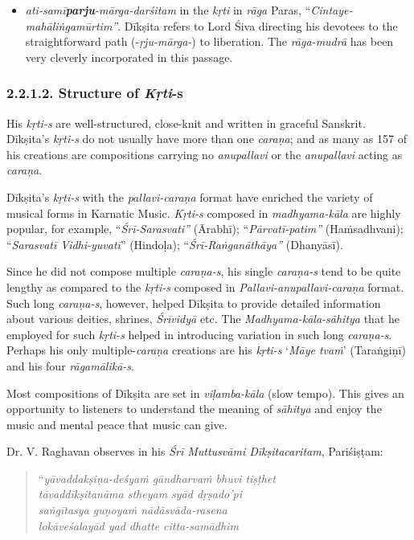 \begin{itemize}
 \item \textit{ati-samī\textbf{parju}-mārga-darśitam} in the \textit{kṛti} in \textit{rāga} Paras, “\textit{Cintaye-mahāliṅgamūrtim”}. Dīkṣita refers to Lord Śiva directing his devotees to the straightforward path (-\textit{ṛju-mārga-}) to liberation. The \textit{rāga-mudrā} has been very cleverly incorporated in this passage.

\end{itemize}


\subsubsection*{2.2.1.2. Structure of \textit{Kṛti}-s}

His \textit{kṛti-s} are well-structured, close-knit and written in graceful Sanskrit. Dīkṣita’s \textit{kṛti-s} do not usually have more than one \textit{caraṇa}; and as many as 157 of his creations are compositions carrying no \textit{anupallavi} or the \textit{anupallavi} acting as \textit{caraṇa}.

Dīkṣita’s \textit{kṛti-s} with the \textit{pallavi-caraṇa} format have enriched the variety of musical forms in Karnatic Music. \textit{Kṛti-s} composed in \textit{madhyama-kāla} are highly popular, for example, “\textit{Śrī-Sarasvati”} (Ārabhī); “\textit{Pārvatī-patim”} (Haṁsadhvani); “\textit{Sarasvatī Vidhi-yuvatī}” (Hindoḷa); “\textit{Śrī-Raṅganāthāya”} (Dhanyāsī).

Since he did not compose multiple \textit{caraṇa-s}, his single \textit{caraṇa-s} tend to be quite lengthy as compared to the \textit{kṛti-s} composed in \textit{Pallavi-anupallavi-caraṇa} format. Such long \textit{caraṇa-s}, however, helped Dīkṣita to provide detailed information about various deities, shrines, \textit{Śrīvidyā} etc. The \textit{Madhyama-kāla-sāhitya} that he employed for such \textit{kṛti-s} helped in introducing variation in such long \textit{caraṇa-s}. Perhaps his only multiple-\textit{caraṇa} creations are his \textit{kṛti-s} ‘\textit{Māye tvaṁ}’ (Taraṅgiṇī) and his four \textit{rāgamālikā-s}.

Most compositions of Dīkṣita are set in \textit{viḷamba-kāla} (slow tempo). This gives an opportunity to listeners to understand the meaning of \textit{sāhitya} and enjoy the music and mental peace that music can give.

Dr. V. Raghavan observes in his \textit{Śrī Muttusvāmi Dīkṣitacaritam}, Pariśiṣṭam:

\begin{verse}
“\textit{yāvaddakṣiṇa-deśyaṁ gāndharvaṁ bhuvi tiṣṭhet} \\\textit{tāvaddīkṣitanāma stheyam syād dṛṣado'pi} \\\textit{saṅgītasya guṇoyaṁ nādāsvāda-rasena} \\\textit{lokāveśalayād yad dhatte citta-samādhim} 
\end{verse}

